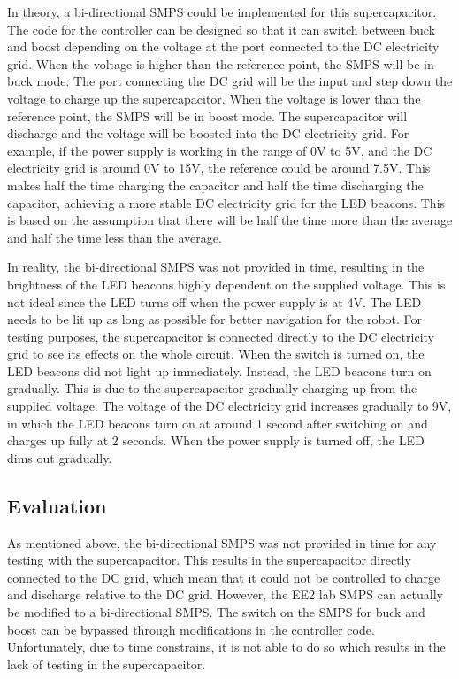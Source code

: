 In theory, a bi-directional SMPS could be implemented for this supercapacitor. The code for the controller can be designed so that it can switch between buck and boost depending on the voltage at the port connected to the DC electricity grid. When the voltage is higher than the reference point, the SMPS will be in buck mode. The port connecting the DC grid will be the input and step down the voltage to charge up the supercapacitor. When the voltage is lower than the reference point, the SMPS will be in boost mode. The supercapacitor will discharge and the voltage will be boosted into the DC electricity grid. For example, if the power supply is working in the range of 0V to 5V, and the DC electricity grid is around 0V to 15V, the reference could be around 7.5V. This makes half the time charging the capacitor and half the time discharging the capacitor, achieving a more stable DC electricity grid for the LED beacons. This is based on the assumption that there will be half the time more than the average and half the time less than the average.

In reality, the bi-directional SMPS was not provided in time, resulting in the brightness of the LED beacons highly dependent on the supplied voltage. This is not ideal since the LED turns off when the power supply is at 4V. The LED needs to be lit up as long as possible for better navigation for the robot. For testing purposes, the supercapacitor is connected directly to the DC electricity grid to see its effects on the whole circuit. When the switch is turned on, the LED beacons did not light up immediately. Instead, the LED beacons turn on gradually. This is due to the supercapacitor gradually charging up from the supplied voltage. The voltage of the DC electricity grid increases gradually to 9V, in which the LED beacons turn on at around 1 second after switching on and charges up fully at 2 seconds. When the power supply is turned off, the LED dims out gradually.

\subsection{Evaluation}

As mentioned above, the bi-directional SMPS was not provided in time for any testing with the supercapacitor. This results in the supercapacitor directly connected to the DC grid, which mean that it could not be controlled to charge and discharge relative to the DC grid. However, the EE2 lab SMPS can actually be modified to a bi-directional SMPS. The switch on the SMPS for buck and boost can be bypassed through modifications in the controller code. Unfortunately, due to time constrains, it is not able to do so which results in the lack of testing in the supercapacitor.

